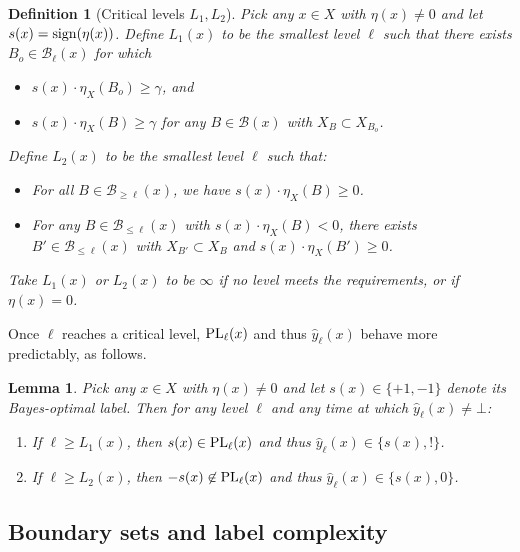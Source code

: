 \documentclass[twoside]{article}
\def\B{{\mathcal B}}
\def\yh{{\widehat{y}}}
\def\sign{{\rm sign}}
\def\PL{{\mbox{\rm PL}}}
\newtheorem{lemma}[thm]{Lemma}
\newtheorem{defn}[thm]{Definition}
\begin{document}
\begin{defn}[Critical levels $L_1,L_2$]
Pick any $x \in X$ with $\eta(x) \neq 0$ and let $s(x) = \sign(\eta(x))$. Define $L_1(x)$ to be the smallest level $\ell$ such that there exists $B_o \in \B_\ell(x)$ for which
\begin{itemize}[leftmargin=0.5cm]
\item $s(x) \cdot \eta_X(B_o) \geq \gamma$, and
\item $s(x) \cdot \eta_X(B) \geq \gamma$ for any $B \in \B(x)$ with $X_{B} \subset X_{B_o}$.
\end{itemize}
Define $L_2(x)$ to be the smallest level $\ell$ such that:
\begin{itemize}[leftmargin=0.5cm]
\item For all $B \in \B_{\geq \ell}(x)$, we have $s(x) \cdot \eta_X(B) \geq 0$.
\item For any $B \in \B_{\leq \ell}(x)$ with $s(x) \cdot \eta_X(B) < 0$, there exists $B' \in \B_{\leq \ell}(x)$ with $X_{B'} \subset X_B$ and $s(x) \cdot \eta_X(B') \geq 0$.
\end{itemize}
Take $L_1(x)$ or $L_2(x)$ to be $\infty$ if no level meets the requirements, or if $\eta(x) = 0$. 
\label{defn:L12}
\end{defn}

Once $\ell$ reaches a critical level, $\PL_\ell(x)$ and thus $\yh_\ell(x)$ behave more predictably, as follows.
\begin{lemma}
Pick any $x \in X$ with $\eta(x) \neq 0$ and let $s(x) \in \{+1,-1\}$ denote its Bayes-optimal label. Then for any level $\ell$ and any time at which $\yh_\ell(x) \neq \bot$:
\begin{enumerate}
\item[(a)] If $\ell \geq L_1(x)$, then $s(x) \in \PL_\ell(x)$ and thus $\yh_\ell(x) \in \{s(x), !\}$. 
\item[(b)] If $\ell \geq L_2(x)$, then $-s(x) \not\in \PL_\ell(x)$ and thus $\yh_\ell(x) \in \{s(x), 0\}$.
\end{enumerate}
\label{lemma:boundary}
\end{lemma}

\subsection{Boundary sets and label complexity}
\end{document}
